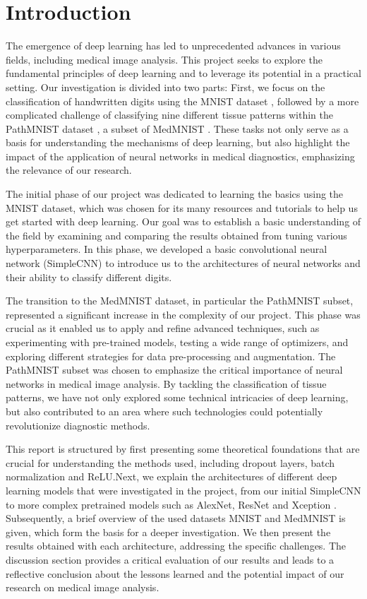 \section{Introduction}\label{intro}


The emergence of deep learning has led to unprecedented advances in various fields, including medical image analysis. This project seeks to explore the fundamental principles of deep learning and to leverage its potential in a practical setting. Our investigation is divided into two parts: First, we focus on the classification of handwritten digits using the MNIST dataset \citep{mnist}, followed by a more complicated challenge of classifying nine different tissue patterns within the PathMNIST dataset \citep{kather2018, kather2019}, a subset of MedMNIST \citep{medmnistv1}. These tasks not only serve as a basis for understanding the mechanisms of deep learning, but also highlight the impact of the application of neural networks in medical diagnostics, emphasizing the relevance of our research.

The initial phase of our project was dedicated to learning the basics using the MNIST dataset, which was chosen for its many resources and tutorials to help us get started with deep learning. Our goal was to establish a basic understanding of the field by examining and comparing the results obtained from tuning various hyperparameters. In this phase, we developed a basic convolutional neural network (SimpleCNN) to introduce us to the architectures of neural networks and their ability to classify different digits.

The transition to the MedMNIST dataset, in particular the PathMNIST subset, represented a significant increase in the complexity of our project. This phase was crucial as it enabled us to apply and refine advanced techniques, such as experimenting with pre-trained models, testing a wide range of optimizers, and exploring different strategies for data pre-processing and augmentation. The PathMNIST subset was chosen to emphasize the critical importance of neural networks in medical image analysis. By tackling the classification of tissue patterns, we have not only explored some technical intricacies of deep learning, but also contributed to an area where such technologies could potentially revolutionize diagnostic methods.

This report is structured by first presenting some theoretical foundations that are crucial for understanding the methods used, including dropout layers, batch normalization and ReLU.\@ Next, we explain the architectures of different deep learning models that were investigated in the project, from our initial SimpleCNN to more complex pretrained models such as AlexNet, ResNet and Xception \citep{chollet2017xception}. Subsequently, a brief overview of the used datasets MNIST and MedMNIST is given, which form the basis for a deeper investigation. We then present the results obtained with each architecture, addressing the specific challenges. The discussion section provides a critical evaluation of our results and leads to a reflective conclusion about the lessons learned and the potential impact of our research on medical image analysis.
